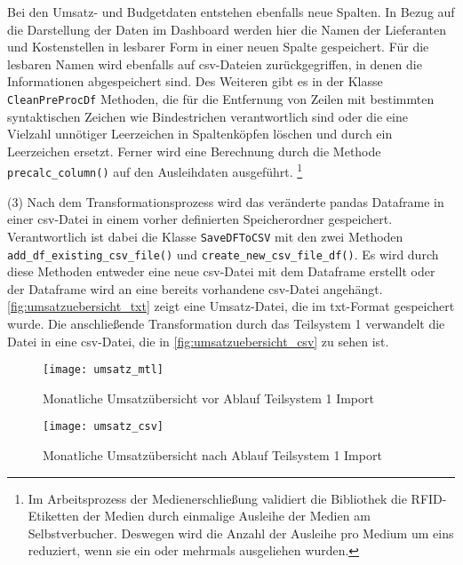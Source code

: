     
    Bei den Umsatz- und Budgetdaten entstehen ebenfalls neue Spalten. In Bezug auf die Darstellung der Daten im Dashboard werden
    hier die Namen der Lieferanten und Kostenstellen in lesbarer Form in einer neuen Spalte gespeichert. Für die lesbaren Namen wird ebenfalls auf csv-Dateien zurückgegriffen, in denen die Informationen abgespeichert sind.
    Des Weiteren gibt es in der Klasse \texttt{CleanPreProcDf} Methoden, die für die Entfernung von Zeilen mit bestimmten syntaktischen Zeichen wie Bindestrichen 
    verantwortlich sind oder die eine Vielzahl unnötiger Leerzeichen in Spaltenköpfen löschen  und durch ein Leerzeichen ersetzt.
    Ferner wird eine Berechnung durch die Methode \texttt{precalc\_column()} auf den Ausleihdaten ausgeführt.
    \footnote{Im Arbeitsprozess der Medienerschließung validiert die Bibliothek die RFID-Etiketten der Medien durch einmalige Ausleihe der Medien am Selbstverbucher.
    Deswegen wird die Anzahl der Ausleihe pro Medium um eins reduziert, wenn sie ein oder mehrmals ausgeliehen wurden.}
     
    (3) Nach dem Transformationsprozess wird das veränderte pandas Dataframe in einer csv-Datei in einem vorher definierten Speicherordner gespeichert. 
    Verantwortlich ist dabei die Klasse \texttt{SaveDFToCSV} mit den zwei Methoden \texttt{add\_df\_existing\_csv\_file()} und 
    \texttt{create\_new\_csv\_file\_df()}. 
    Es wird durch diese Methoden entweder eine neue csv-Datei mit dem Dataframe erstellt oder der Dataframe wird an eine bereits vorhandene csv-Datei angehängt.
    \autoref{fig:umsatzuebersicht_txt} zeigt eine Umsatz-Datei, die im txt-Format gespeichert wurde. Die anschließende Transformation durch das Teilsystem 1
    verwandelt die Datei in eine csv-Datei, die in \autoref{fig:umsatzuebersicht_csv} zu sehen ist.

    \begin{figure}[H]
        \centering
            \texttt{[image: umsatz\_mtl]}
            \caption{Monatliche Umsatzübersicht vor Ablauf Teilsystem 1 Import}
            \label{fig:umsatzuebersicht_txt}
    \end{figure}


    \begin{figure}[H]
        \centering
            \texttt{[image: umsatz\_csv]}
            \caption{Monatliche Umsatzübersicht nach Ablauf Teilsystem 1 Import}
            \label{fig:umsatzuebersicht_csv}
    \end{figure}

